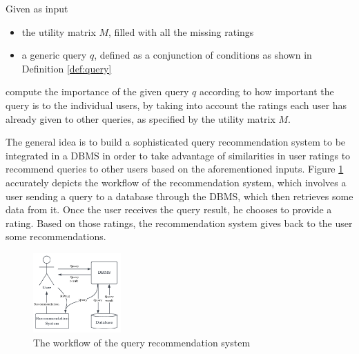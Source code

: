 \begin{definition}
    Given as input
    \begin{itemize}
        \item the utility matrix $M$, filled with all the missing ratings
        \item a generic query $q$, defined as a conjunction of conditions as shown in Definition \ref{def:query} 
    \end{itemize}
    compute the importance of the given query $q$ according to how important the query is to the individual users, by taking into account the ratings each user has already given to other queries, as specified by the utility matrix $M$.
\end{definition}


The general idea is to build a sophisticated query recommendation system to be integrated in a DBMS in order to take advantage of similarities in user ratings to recommend queries to other users based on the aforementioned inputs. Figure \ref{fig:workflow} accurately depicts the workflow of the recommendation system, which involves a user sending a query to a database through the DBMS, which then retrieves some data from it. Once the user receives the query result, he chooses to provide a rating. Based on those ratings, the recommendation system gives back to the user some recommendations.


\begin{figure}[h]
    \centering
    \includegraphics[width=0.30\textwidth]{imgs/architecture.pdf}
    \caption{\normalfont The workflow of the query recommendation system}
    \label{fig:workflow}
\end{figure}